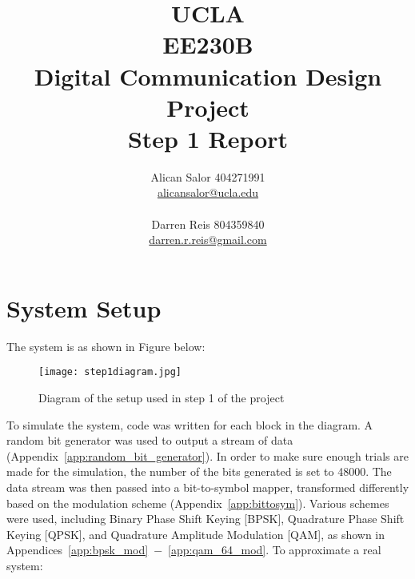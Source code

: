 \documentclass[]{article}
\title{UCLA\\EE230B\\Digital Communication Design Project\\Step 1 Report}
\author{Alican Salor 404271991 \\  \href{mailto:alicansalor@ucla.edu}{alicansalor@ucla.edu} \\ \\
Darren Reis 804359840 \\
\href{mailto:darrer.r.reis@gmail.com}{darren.r.reis@gmail.com} }
\begin{document}
\maketitle

\newpage
\tableofcontents

\newpage


\section{System Setup}
\label{sec:setup}
The system is as shown in Figure below:


\begin{figure}[H]
\centering
\texttt{[image: step1diagram.jpg]}
\caption{Diagram of the setup used in step 1 of the project}
\end{figure}

To simulate the system, code was written for each block in the diagram.  A random bit generator was used to output a stream of data (Appendix~\ref{app:random_bit_generator}). In order to make sure enough trials are made for the simulation, the number of the bits generated is set to 48000. The data stream was then passed into a bit-to-symbol mapper, transformed differently based on the modulation scheme (Appendix~\ref{app:bittosym}).  Various schemes were used, including Binary Phase Shift Keying [BPSK], Quadrature Phase Shift Keying [QPSK], and Quadrature Amplitude Modulation [QAM], as shown in Appendices~\ref{app:bpsk_mod}~$-$~\ref{app:qam_64_mod}. To approximate a real system:
\end{document}
